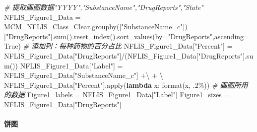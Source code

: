 \documentclass[
]{article}
\newenvironment{Shaded}{}{}
\newcommand{\BuiltInTok}[1]{#1}
\newcommand{\CommentTok}[1]{\textcolor[rgb]{0.38,0.63,0.69}{\textit{#1}}}
\newcommand{\KeywordTok}[1]{\textcolor[rgb]{0.00,0.44,0.13}{\textbf{#1}}}
\newcommand{\NormalTok}[1]{#1}
\newcommand{\OperatorTok}[1]{\textcolor[rgb]{0.40,0.40,0.40}{#1}}
\newcommand{\StringTok}[1]{\textcolor[rgb]{0.25,0.44,0.63}{#1}}
\newcommand{\VariableTok}[1]{\textcolor[rgb]{0.10,0.09,0.49}{#1}}
\begin{document}
\begin{Shaded}
\begin{Highlighting}[]
\CommentTok{\# 提取画图数据"YYYY","SubstanceName","DrugReports","State"}
\NormalTok{NFLIS\_Figure1\_Data }\OperatorTok{=}\NormalTok{ MCM\_NFLIS\_Class\_Clear.groupby([}\StringTok{"SubstanceName\_c"}\NormalTok{])[}\StringTok{"DrugReports"}\NormalTok{].}\BuiltInTok{sum}\NormalTok{().reset\_index().sort\_values(by}\OperatorTok{=}\StringTok{"DrugReports"}\NormalTok{,ascending}\OperatorTok{=}\VariableTok{True}\NormalTok{)}
\CommentTok{\# 添加列：每种药物的百分占比}
\NormalTok{NFLIS\_Figure1\_Data[}\StringTok{"Percent"}\NormalTok{] }\OperatorTok{=}\NormalTok{ NFLIS\_Figure1\_Data[}\StringTok{"DrugReports"}\NormalTok{]}\OperatorTok{/}\NormalTok{(NFLIS\_Figure1\_Data[}\StringTok{"DrugReports"}\NormalTok{].}\BuiltInTok{sum}\NormalTok{())}
\NormalTok{NFLIS\_Figure1\_Data[}\StringTok{"Label"}\NormalTok{] }\OperatorTok{=}\NormalTok{ NFLIS\_Figure1\_Data[}\StringTok{"SubstanceName\_c"}\NormalTok{] }\OperatorTok{+\textbackslash{}}
                                \CommentTok{\textquotesingle{}          \textquotesingle{}} \OperatorTok{+} \OperatorTok{\textbackslash{}}
\NormalTok{                                NFLIS\_Figure1\_Data[}\StringTok{"Percent"}\NormalTok{].}\BuiltInTok{apply}\NormalTok{(}\KeywordTok{lambda}\NormalTok{ x: }\BuiltInTok{format}\NormalTok{(x, }\StringTok{\textquotesingle{}.2\%\textquotesingle{}}\NormalTok{))}
\CommentTok{\# 画图所用的数据}
\NormalTok{Figure1\_labels }\OperatorTok{=}\NormalTok{ NFLIS\_Figure1\_Data[}\StringTok{"Label"}\NormalTok{]}
\NormalTok{Figure1\_sizes }\OperatorTok{=}\NormalTok{ NFLIS\_Figure1\_Data[}\StringTok{"DrugReports"}\NormalTok{]}
\end{Highlighting}
\end{Shaded}

\hypertarget{header-n227}{%
\paragraph{饼图}\label{header-n227}}
\end{document}
